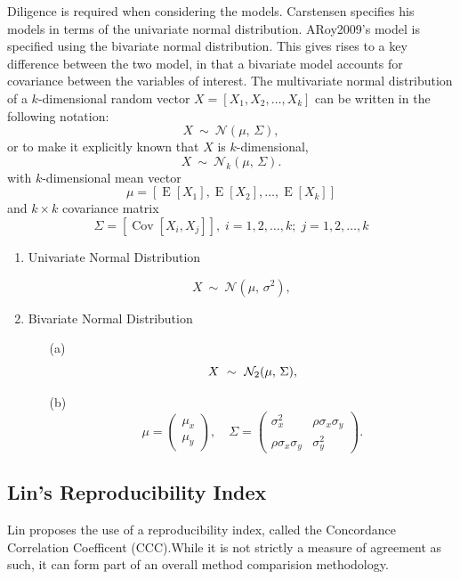 \documentclass[12pt, a4paper]{report}
\theoremstyle{plain}
\theoremstyle{definition}
\theoremstyle{remark}
\begin{document}
	Diligence is required when considering the models. Carstensen specifies his models in terms of the univariate normal distribution. ARoy2009's model is specified using the bivariate normal distribution.
	This gives rises to a key difference between the two model, in that a bivariate model accounts for covariance between the variables of interest.
	The multivariate normal distribution of a $k$-dimensional random vector $X = [X_1, X_2, \ldots, X_k]$
	can be written in the following notation:
	\[
	X\ \sim\ \mathcal{N}(\mu,\, \Sigma),
	\]
	or to make it explicitly known that $X$ is $k$-dimensional,
	\[
	X\ \sim\ \mathcal{N}_k(\mu,\, \Sigma).
	\]
	with $k$-dimensional mean vector
	\[ \mu = [ \operatorname{E}[X_1], \operatorname{E}[X_2], \ldots, \operatorname{E}[X_k]] \]
	and $k \times k$ covariance matrix
	\[ \Sigma = [\operatorname{Cov}[X_i, X_j]], \; i=1,2,\ldots,k; \; j=1,2,\ldots,k \]
	
	\bigskip
	
	\begin{enumerate}
		\item Univariate Normal Distribution
		
		\[
		X\ \sim\ \mathcal{N}(\mu,\, \sigma^2),
		\]
		
		\item Bivariate Normal Distribution
		
		\begin{itemize}
			\item[(a)] \[  X\ \sim\ \mathcal{N}_2(\mu,\, \Sigma), \vspace{1cm}\]
			\item[(b)] \[    \mu = \begin{pmatrix} \mu_x \\ \mu_y \end{pmatrix}, \quad
			\Sigma = \begin{pmatrix} \sigma_x^2 & \rho \sigma_x \sigma_y \\
			\rho \sigma_x \sigma_y  & \sigma_y^2 \end{pmatrix}.\]
		\end{itemize}
	\end{enumerate}
	
	
	
	\subsection{Lin's Reproducibility Index} Lin proposes the use of a
	reproducibility index, called the Concordance Correlation
	Coefficent (CCC).While it is not strictly a measure of agreement
	as such, it can form part of an overall method comparision
	methodology.
\end{document}
